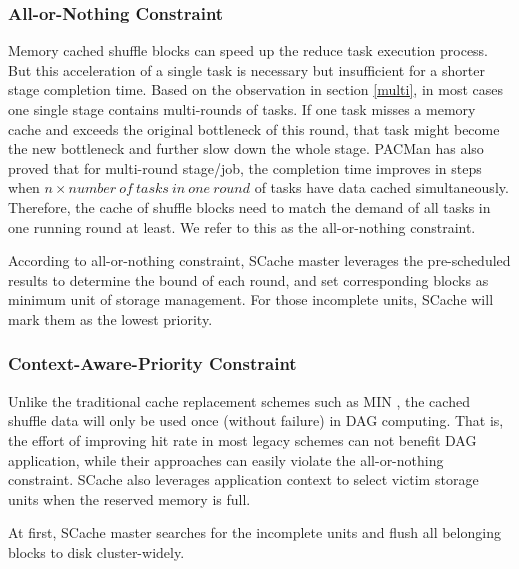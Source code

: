 \subsubsection{All-or-Nothing Constraint}
Memory cached shuffle blocks can speed up the reduce task execution process. But this acceleration of a single task is necessary but insufficient for a shorter stage completion time. Based on the observation in section \ref{multi}, in most cases one single stage contains multi-rounds of tasks. If one task misses a memory cache and exceeds the original bottleneck of this round, that task might become the new bottleneck and further slow down the whole stage. PACMan \cite{pacman} has also proved that for multi-round stage/job, the completion time improves in steps when $n\times number\ of\ tasks\ in\ one\ round$ of tasks have data cached simultaneously. Therefore, the cache of shuffle blocks need to match the demand of all tasks in one running round at least. We refer to this as the all-or-nothing constraint.

According to all-or-nothing constraint, SCache master leverages the pre-scheduled results to determine the bound of each round, and set corresponding blocks as minimum unit of storage management.
For those incomplete units, SCache will mark them as the lowest priority.

\subsubsection{Context-Aware-Priority Constraint}
Unlike the traditional cache replacement schemes such as MIN \cite{min}, the cached shuffle data will only be used once (without failure) in DAG computing. That is, the effort of improving hit rate in most legacy schemes can not benefit DAG application, while their approaches can easily violate the all-or-nothing constraint.
SCache also leverages application context to select victim storage units when the reserved memory is full.

At first, SCache master searches for the incomplete units and flush all belonging blocks to disk cluster-widely.

